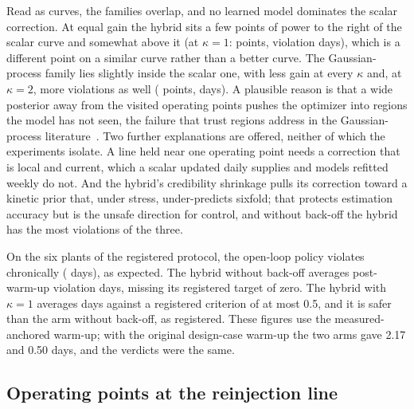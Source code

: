 Read as curves, the families overlap, and no learned model dominates
the scalar correction. At equal gain the hybrid sits a few points of
power to the right of the scalar curve and somewhat above it (at
$\kappa = 1$:  points,  violation days),
which is a different point on a similar curve rather than a better
curve. The Gaussian-process family lies slightly inside the scalar one,
with less gain at every $\kappa$ and, at $\kappa = 2$, more violations
as well ( points,  days). A plausible
reason is that a wide posterior away from the visited operating points
pushes the optimizer into regions the model has not seen, the failure
that trust regions address in the Gaussian-process
literature~\citep{delriochanona2021tale}. Two further explanations are
offered, neither of which the experiments isolate. A line held near one
operating point needs a correction that is local and current, which a
scalar updated daily supplies and models refitted weekly do not. And
the hybrid's credibility shrinkage pulls its correction toward a
kinetic prior that, under stress, under-predicts sixfold; that protects
estimation accuracy but is the unsafe direction for control, and
without back-off the hybrid has the most violations of the three.

On the six plants of the registered protocol, the open-loop policy
violates chronically ( days), as expected. The hybrid
without back-off averages  post-warm-up violation days,
missing its registered target of zero. The hybrid with $\kappa = 1$
averages  days against a registered criterion of at most
0.5, and it is safer than the arm without back-off, as registered. These
figures use the measured-anchored warm-up; with the original
design-case warm-up the two arms gave 2.17 and 0.50 days, and the
verdicts were the same.

\subsection{Operating points at the reinjection line}\label{sec:operating}


